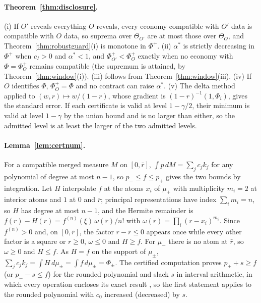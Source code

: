 \documentclass[12pt]{article}
\theoremstyle{definition}
\theoremstyle{remark}
\begin{document}
\paragraph{Theorem~\ref{thm:disclosure}.} (i) If $O'$ reveals everything $O$ reveals, every economy compatible with $O'$ data is compatible with $O$ data, so suprema over $\Theta_{O'}$ are at most those over $\Theta_O$, and Theorem~\ref{thm:robustguard}(i) is monotone in $\Phi^+$. (ii) $\alpha^*$ is strictly decreasing in $\Phi^+$ when $c_I>0$ and $\alpha^*<1$, and $\Phi^+_{O'}<\Phi^+_O$ exactly when no economy with $\Phi=\Phi^+_O$ remains compatible (the supremum is attained, by Theorem~\ref{thm:window}(i)). (iii) follows from Theorem~\ref{thm:window}(iii). (iv) If $O$ identifies $\Phi$, $\Phi^+_O=\Phi$ and no contract can raise $\alpha^*$. (v) The delta method applied to $(w,r)\mapsto w/(1-r)$, whose gradient is $(1-r)^{-1}(1,\Phi_i)$, gives the standard error. If each certificate is valid at level $1-\gamma/2$, their minimum is valid at level $1-\gamma$ by the union bound and is no larger than either, so the admitted level is at least the larger of the two admitted levels.

\paragraph{Lemma~\ref{lem:certnum}.} For a compatible merged measure $M$ on $[0,\bar r]$, $\int p\,dM=\sum_jc_jk_j$ for any polynomial of degree at most $n-1$, so $p_-\le f\le p_+$ gives the two bounds by integration. Let $H$ interpolate $f$ at the atoms $x_i$ of $\mu_+$ with multiplicity $m_i=2$ at interior atoms and $1$ at $0$ and $\bar r$; principal representations have index $\sum_im_i=n$, so $H$ has degree at most $n-1$, and the Hermite remainder is $f(r)-H(r)=f^{(n)}(\xi)\,\omega(r)/n!$ with $\omega(r)=\prod_i(r-x_i)^{m_i}$. Since $f^{(n)}>0$ and, on $[0,\bar r]$, the factor $r-\bar r\le0$ appears once while every other factor is a square or $r\ge0$, $\omega\le0$ and $H\ge f$. For $\mu_-$ there is no atom at $\bar r$, so $\omega\ge0$ and $H\le f$. As $H=f$ on the support of $\mu_\pm$, $\sum_jc_jk_j=\int H\,d\mu_\pm=\int f\,d\mu_\pm=\Phi_\pm$. The certified computation proves $p_++s\ge f$ (or $p_--s\le f$) for the rounded polynomial and slack $s$ in interval arithmetic, in which every operation encloses its exact result \citep{rump2010}, so the first statement applies to the rounded polynomial with $c_0$ increased (decreased) by $s$.
\end{document}
